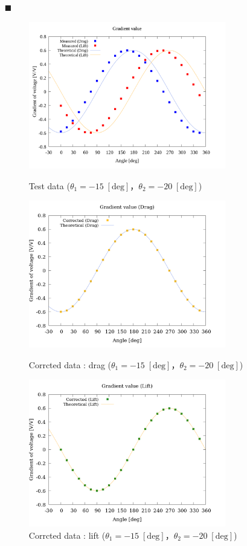 \documentclass[twocolumn,a4j]{jsarticle}
\begin{document}
\newpage

\begin{itemize}
    \item [$\blacksquare$] \\
        \begin{figure}[htbp]
            \footnotesize
            \begin{center}
                \includegraphics[width=86mm]{../graphes/simulation_-150_-200/20/20_adjust-value.png}
                  \caption{Test data ($\theta_1 = -15 \; [\mathrm{deg}]$，$\theta_2 = -20 \; [\mathrm{deg}]$)}
                  \includegraphics[width=86mm]{../graphes/simulation_-150_-200/21/21-2_corrected_drag.png}
                  \caption{Corrcted data : drag ($\theta_1 = -15 \; [\mathrm{deg}]$，$\theta_2 = -20 \; [\mathrm{deg}]$)}
                \includegraphics[width=86mm]{../graphes/simulation_-150_-200/21/21-2_corrected_lift.png}
                  \caption{Corrcted data : lift ($\theta_1 = -15 \; [\mathrm{deg}]$，$\theta_2 = -20 \; [\mathrm{deg}]$)}
                \end{center}
        \end{figure}
\end{itemize}
\end{document}
